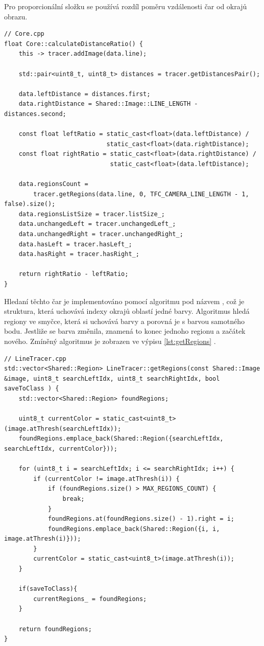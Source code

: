 Pro proporcionální složku se používá rozdíl poměru vzdálenosti čar od okrajů obrazu.
\begin{lstlisting}[caption = Kalkulace poměru vzdálenosti čar, label = lst:calculateDistanceRatio]
// Core.cpp
float Core::calculateDistanceRatio() {
    this -> tracer.addImage(data.line);

    std::pair<uint8_t, uint8_t> distances = tracer.getDistancesPair();

    data.leftDistance = distances.first;
    data.rightDistance = Shared::Image::LINE_LENGTH - distances.second;

    const float leftRatio = static_cast<float>(data.leftDistance) /
                            static_cast<float>(data.rightDistance);
    const float rightRatio = static_cast<float>(data.rightDistance) /
                             static_cast<float>(data.leftDistance);

    data.regionsCount =
        tracer.getRegions(data.line, 0, TFC_CAMERA_LINE_LENGTH - 1, false).size();
    data.regionsListSize = tracer.listSize_;
    data.unchangedLeft = tracer.unchangedLeft_;
    data.unchangedRight = tracer.unchangedRight_;
    data.hasLeft = tracer.hasLeft_;
    data.hasRight = tracer.hasRight_;

    return rightRatio - leftRatio;
}
\end{lstlisting}

Hledaní těchto čar je implementováno pomocí algoritmu pod názvem , což je struktura, která uchovává indexy okrajů oblastí jedné barvy.
Algoritmus hledá regiony ve smyčce, která si uchovává barvy a porovná je s barvou
samotného bodu. Jestliže se barva změnila, znamená to konec jednoho regionu a
začátek nového. Zmíněný algoritmus je zobrazen ve výpisu \ref{lst:getRegions} \cite{robot}.
\begin{lstlisting}[caption = Algoritmus hledání regionu, label = lst:getRegions]
// LineTracer.cpp
std::vector<Shared::Region> LineTracer::getRegions(const Shared::Image &image, uint8_t searchLeftIdx, uint8_t searchRightIdx, bool saveToClass ) {
	std::vector<Shared::Region> foundRegions;

	uint8_t currentColor = static_cast<uint8_t>(image.atThresh(searchLeftIdx));
	foundRegions.emplace_back(Shared::Region({searchLeftIdx, searchLeftIdx, currentColor}));

	for (uint8_t i = searchLeftIdx; i <= searchRightIdx; i++) {
		if (currentColor != image.atThresh(i)) {
			if (foundRegions.size() > MAX_REGIONS_COUNT) {
				break;
			}
			foundRegions.at(foundRegions.size() - 1).right = i;
			foundRegions.emplace_back(Shared::Region({i, i, image.atThresh(i)}));
		}
		currentColor = static_cast<uint8_t>(image.atThresh(i));
	}

	if(saveToClass){
		currentRegions_ = foundRegions;
	}

	return foundRegions;
}
\end{lstlisting}

